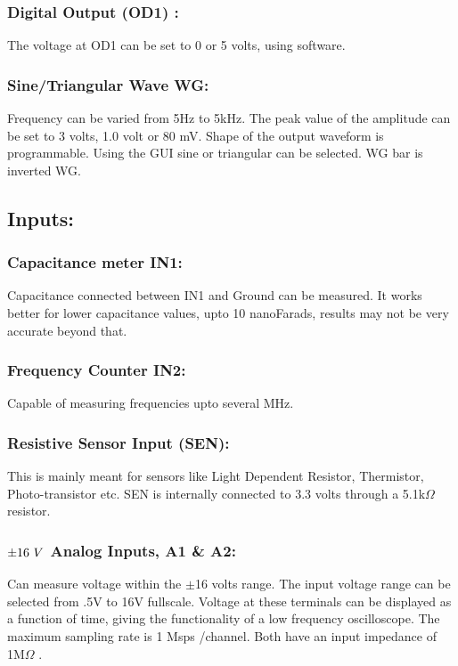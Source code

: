 \documentclass[a4paper,12pt,english]{sphinxmanual}
\begin{document}
\subsubsection{Digital Output (OD1) :}
\label{\detokenize{1.2:digital-output-od1}}
The voltage at OD1 can be set to 0 or 5 volts, using software.


\subsubsection{Sine/Triangular Wave WG:}
\label{\detokenize{1.2:sine-triangular-wave-wg}}
Frequency can be varied from 5Hz to 5kHz. The peak value of the
amplitude can be set to 3 volts, 1.0 volt or 80 mV. Shape of the output
waveform is programmable. Using the GUI sine or triangular can be
selected. WG bar is inverted WG.


\subsection{Inputs:}
\label{\detokenize{1.2:inputs}}

\subsubsection{Capacitance meter IN1:}
\label{\detokenize{1.2:capacitance-meter-in1}}
Capacitance connected between IN1 and Ground can be measured. It works
better for lower capacitance values, upto 10 nanoFarads, results may not
be very accurate beyond that.


\subsubsection{Frequency Counter IN2:}
\label{\detokenize{1.2:frequency-counter-in2}}
Capable of measuring frequencies upto several MHz.


\subsubsection{Resistive Sensor Input (SEN):}
\label{\detokenize{1.2:resistive-sensor-input-sen}}
This is mainly meant for sensors like Light Dependent Resistor,
Thermistor, Photo-transistor etc. SEN is internally connected to 3.3
volts through a 5.1k\(\Omega\) resistor.


\subsubsection{\protect\(\pm16\ V\protect\) Analog Inputs, A1 \& A2:}
\label{\detokenize{1.2:pm16-v-analog-inputs-a1-a2}}
Can measure voltage within the \(\pm\)16 volts range. The input voltage range
can be selected from .5V to 16V fullscale. Voltage at these terminals
can be displayed as a function of time, giving the functionality of a
low frequency oscilloscope. The maximum sampling rate is 1 Msps
/channel. Both have an input impedance of 1M\(\Omega\) .
\end{document}

